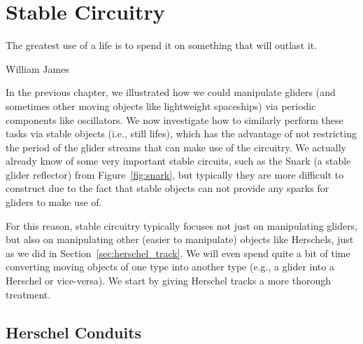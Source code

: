 
\renewcommand{\chapterfolder}{stationary_circuitry/}

\chapter{Stable Circuitry}\label{chp:stationary_circuitry}


\vspace*{-0.4in}
\epigraph{The greatest use of a life is to spend it on something that will outlast it.}{William James}
\vspace*{0.4in}


\noindent In the previous chapter, we illustrated how we could manipulate gliders (and sometimes other moving objects like lightweight spaceships) via periodic components like oscillators. We now investigate how to similarly perform these tasks via stable objects (i.e., still lifes), which has the advantage of not restricting the period of the glider streams that can make use of the circuitry. We actually already know of some very important stable circuits, such as the Snark (a stable glider reflector) from Figure~\ref{fig:snark}, but typically they are more difficult to construct due to the fact that stable objects can not provide any sparks for gliders to make use of.

For this reason, stable circuitry typically focuses not just on manipulating gliders, but also on manipulating other (easier to manipulate) objects like Herschels, just as we did in Section~\ref{sec:herschel_track}. We will even spend quite a bit of time converting moving objects of one type into another type (e.g., a glider into a Herschel or vice-versa). We start by giving Herschel tracks a more thorough treatment.


\section{Herschel Conduits}\label{sec:conduits}


